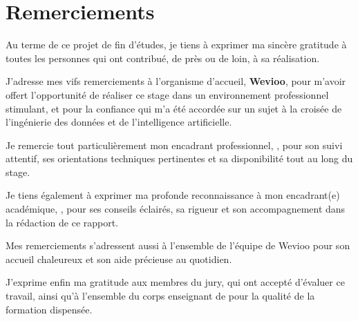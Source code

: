 \chapter*{Remerciements}

Au terme de ce projet de fin d'études, je tiens à exprimer ma sincère gratitude à toutes les personnes qui ont contribué, de près ou de loin, à sa réalisation.

J'adresse mes vifs remerciements à l'organisme d'accueil, \textbf{Wevioo}, pour m'avoir offert l'opportunité de réaliser ce stage dans un environnement professionnel stimulant, et pour la confiance qui m'a été accordée sur un sujet à la croisée de l'ingénierie des données et de l'intelligence artificielle.

Je remercie tout particulièrement mon encadrant professionnel, \encadrantpro, pour son suivi attentif, ses orientations techniques pertinentes et sa disponibilité tout au long du stage.

Je tiens également à exprimer ma profonde reconnaissance à mon encadrant(e) académique, \encadrantacad, pour ses conseils éclairés, sa rigueur et son accompagnement dans la rédaction de ce rapport.

Mes remerciements s'adressent aussi à l'ensemble de l'équipe de Wevioo pour son accueil chaleureux et son aide précieuse au quotidien.

J'exprime enfin ma gratitude aux membres du jury, qui ont accepté d'évaluer ce travail, ainsi qu'à l'ensemble du corps enseignant de \ecole{} pour la qualité de la formation dispensée.

\vspace{1cm}
\hfill \etudiant
